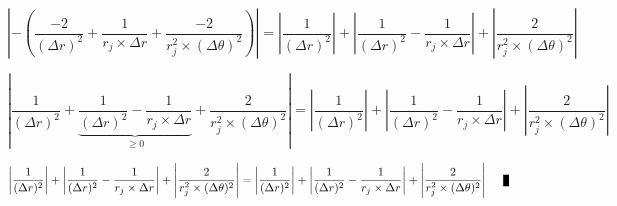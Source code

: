 \begin{equation}
 \left | -\left ( \frac{-2}{(\Delta r)^2} + \frac{1}{r_j \times \Delta r} + \frac{-2}{r_j^2 \times (\Delta \theta)^2} \right ) \right | = \left | \frac{1}{(\Delta r)^2} \right | + \left | \frac{1}{(\Delta r)^2} - \frac{1}{r_j \times \Delta r} \right | + \left | \frac{2}{r_j^2 \times (\Delta \theta)^2} \right | 
\end{equation}

\begin{equation}
 \left | \frac{1}{(\Delta r)^2} + \underbrace{\frac{1}{(\Delta r)^2} - \frac{1}{r_j \times \Delta r}}_{ \geq 0} + \frac{2}{r_j^2 \times (\Delta \theta)^2} \right | = \left | \frac{1}{(\Delta r)^2} \right | + \left | \frac{1}{(\Delta r)^2} - \frac{1}{r_j \times \Delta r} \right | +  \left | \frac{2}{r_j^2 \times (\Delta \theta)^2} \right |
\end{equation}

\begin{equation}
 \left | \frac{1}{(\Delta r)^2} \right | + \left | \frac{1}{(\Delta r)^2} - \frac{1}{r_j \times \Delta r} \right | + \left | \frac{2}{r_j^2 \times (\Delta \theta)^2} \right | = \left | \frac{1}{(\Delta r)^2} \right | + \left | \frac{1}{(\Delta r)^2} - \frac{1}{r_j \times \Delta r} \right | +  \left | \frac{2}{r_j^2 \times (\Delta \theta)^2} \right | \qed
\end{equation}






